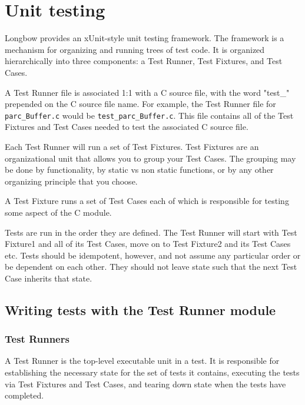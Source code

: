 \section{Unit testing}  
Longbow provides an xUnit-style unit testing framework. The framework is a mechanism for organizing and running trees of test code. It is organized hierarchically into three components: a Test Runner, Test Fixtures, and Test Cases.

A Test Runner file is associated 1:1 with a C source file, with the word "test\_" prepended on the C source file name.  For example, the Test Runner file for {\tt parc\_Buffer.c} would be {\tt test\_parc\_Buffer.c}.
This file contains all of the Test Fixtures and Test Cases needed to test the associated C source file.

Each Test Runner will run a set of Test Fixtures.
Test Fixtures are an organizational unit that allows you to group your Test Cases.
The grouping may be done by functionality, by static vs non static functions, or by any other organizing principle that you choose. 
 
A Test Fixture runs a set of Test Cases each of which is responsible for testing some aspect of the C module. 

Tests are run in the order they are defined.
The Test Runner will start with Test Fixture1 and all of its Test Cases, move on to Test Fixture2 and its Test Cases etc. Tests should be idempotent, however, and not assume any particular order or be dependent on each other.
They should not leave state such that the next Test Case inherits that state. 


\subsection{Writing tests with the Test Runner module }  
\subsubsection{Test Runners}
A Test Runner is the top-level executable unit in a test.
It is responsible for establishing the necessary state for the set of tests it contains, executing the tests via Test Fixtures and Test Cases, and tearing down state when the tests have completed. 

